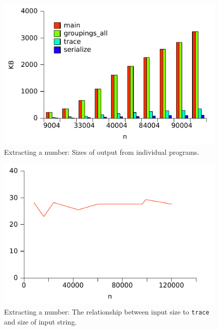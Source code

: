 \begin{figure}
\centering
\includegraphics{benchmarks/memory/number_mbvsize.pdf}
\caption{Extracting a number: Sizes of output from individual programs.}
\label{fig:number_mem_mbvsize}
\end{figure}


\begin{figure}
\centering
\includegraphics{benchmarks/memory/number_mbvsize_relative.pdf}
\caption{Extracting a number: The relationship between input size to
  \texttt{trace} and size of input string.}
\label{fig:number_mem_mbvsize_relative}
\end{figure}


